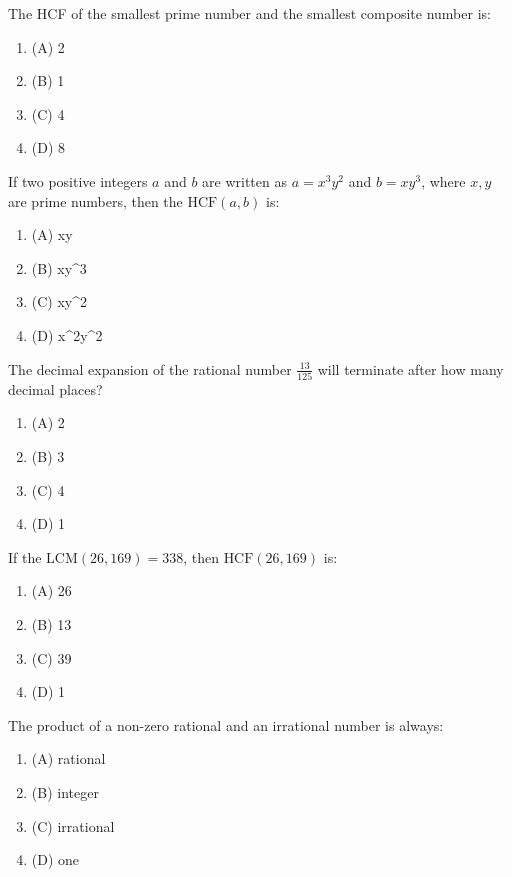 \documentclass[12pt,a4paper]{exam}
\begin{document}
\begin{questions}
\question[1] The HCF of the smallest prime number and the smallest composite number is:
\begin{enumerate}[label=(\Alph*)]
  \item (A) 2
  \item (B) 1
  \item (C) 4
  \item (D) 8
\end{enumerate}
\vspace{0.15cm}

\question[1] If two positive integers $a$ and $b$ are written as $a = x^3y^2$ and $b = xy^3$, where $x, y$ are prime numbers, then the $\text{HCF}(a, b)$ is:
\begin{enumerate}[label=(\Alph*)]
  \item (A) xy
  \item (B) xy\textasciicircum{}3
  \item (C) xy\textasciicircum{}2
  \item (D) x\textasciicircum{}2y\textasciicircum{}2
\end{enumerate}
\vspace{0.15cm}

\question[1] The decimal expansion of the rational number $\frac{13}{125}$ will terminate after how many decimal places?
\begin{enumerate}[label=(\Alph*)]
  \item (A) 2
  \item (B) 3
  \item (C) 4
  \item (D) 1
\end{enumerate}
\vspace{0.15cm}

\question[1] If the $\text{LCM}(26, 169) = 338$, then $\text{HCF}(26, 169)$ is:
\begin{enumerate}[label=(\Alph*)]
  \item (A) 26
  \item (B) 13
  \item (C) 39
  \item (D) 1
\end{enumerate}
\vspace{0.15cm}

\question[1] The product of a non-zero rational and an irrational number is always:
\begin{enumerate}[label=(\Alph*)]
  \item (A) rational
  \item (B) integer
  \item (C) irrational
  \item (D) one
\end{enumerate}
\vspace{0.15cm}


\end{questions}
\end{document}
